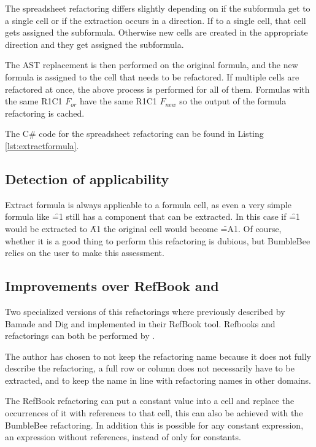The spreadsheet refactoring differs slightly depending on if the subformula get to a single cell or if the extraction occurs in a direction.
If to a single cell, that cell gets assigned the subformula.
Otherwise new cells are created in the appropriate direction and they get assigned the subformula.

The AST replacement is then performed on the original formula, and the new formula is assigned to the cell that needs to be refactored.
If multiple cells are refactored at once, the above process is performed for all of them.
Formulas with the same R1C1 $F_{or}$ have the same R1C1 $F_{new}$ so the output of the formula refactoring is cached.

The C\# code for the spreadsheet refactoring can be found in Listing \ref{lst:extractformula}.

\subsection{Detection of applicability}

Extract formula is always applicable to a formula cell, as even a very simple formula like \f{=1} still has a component that can be extracted.
In this case if \f{=1} would be extracted to \f{A1} the original cell would become \f{=A1}.
Of course, whether it is a good thing to perform this refactoring is dubious, but BumbleBee relies on the user to make this assessment.

\subsection{Improvements over RefBook  and }
\label{subsubsec:improvementsextractformula}

Two specialized versions of this refactorings where previously described by Bamade and Dig \cite{badame2012refactoring} and implemented in their RefBook tool.
Refbooks  and  refactorings can both be performed by .

The author has chosen to not keep the  refactoring name because it does not fully describe the refactoring, a full row or column does not necessarily have to be extracted, and to keep the name in line with refactoring names in other domains.

The RefBook  refactoring can put a constant value into a cell and replace the occurrences of it with references to that cell, this can also be achieved with the BumbleBee  refactoring.
In addition this is possible for any constant expression, an expression without references, instead of only for constants.

